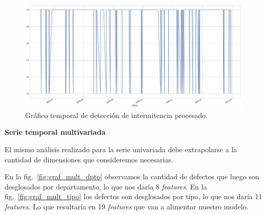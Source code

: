 \documentclass[a4paper,12pt]{article}
\begin{document}
\begin{figure}[H]
	\begin{center}
	\includegraphics[width=1\textwidth]{tesis_81.png}
  	\caption{Gráfico temporal de detección de intermitencia  procesado.}
  	\label{fig:graf_inter_desp}
  	\end{center}
\end{figure}

\textbf{Serie temporal multivariada}

El mismo análisis realizado para la serie univariada debe extrapolarse a la cantidad de dimensiones que consideremos necesarias. 

En la fig.~\ref{fig:graf_mult_dpto} observamos la cantidad de defectos que luego son desglosados por departamento, lo que nos daría 8 \textit{features}. En la fig.~\ref{fig:graf_mult_tipo} los defectos son desglosados por tipo, lo que nos daría 11 \textit{features}. Lo que resultaría en 19 \textit{features} que van a alimentar nuestro modelo.
\end{document}
